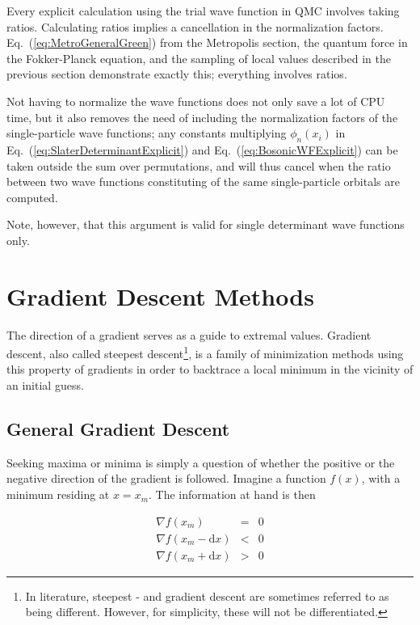Every explicit calculation using the trial wave function in QMC involves taking ratios. Calculating ratios implies a cancellation in the normalization factors. Eq.~(\ref{eq:MetroGeneralGreen}) from the Metropolis section, the quantum force in the Fokker-Planck equation, and the sampling of local values described in the previous section demonstrate exactly this; everything involves ratios.

Not having to normalize the wave functions does not only save a lot of CPU time, but it also removes the need of including the normalization factors of the single-particle wave functions; any constants multiplying $\phi_n(x_i)$ in Eq.~(\ref{eq:SlaterDeterminantExplicit}) and Eq.~(\ref{eq:BosonicWFExplicit}) can be taken outside the sum over permutations, and will thus cancel when the ratio between two wave functions constituting of the same single-particle orbitals are computed. 

Note, however, that this argument is valid for single determinant wave functions only. 

\section{Gradient Descent Methods}
\label{sec:GradientDescent}

The direction of a gradient serves as a guide to extremal values. Gradient descent, also called steepest descent\footnote{In literature, steepest - and gradient descent are sometimes referred to as being different. However, for simplicity, these will not be differentiated.}, is a family of minimization methods using this property of gradients in order to backtrace a local minimum in the vicinity of an initial guess. 

\subsection{General Gradient Descent}

Seeking maxima or minima is simply a question of whether the positive or the negative direction of the gradient is followed.
Imagine a function $f(x)$, with a minimum residing at $x=x_m$. The information at hand is then

\begin{eqnarray}
 \nabla f(x_m) &=& 0 \\
 \nabla f(x_m - \mathrm{d}x) &<& 0 \\
  \nabla f(x_m + \mathrm{d}x) &>& 0
\end{eqnarray}

